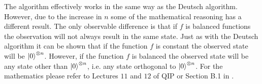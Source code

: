 % 

The algorithm effectively works in the same way as the Deutsch algorithm.
However, due to the increase in $n$ some of the mathematical reasoning has a different result.
The only observable difference is that if $f$ is balanced functions the observation will not always result in the same state.
Just as with the Deutsch algorithm it can be shown that if the function $f$ is constant the observed state will be $\left\vert{0}\right\rangle^{\otimes{n}}$.
However, if the function $f$ is balanced the observed state will be any state other than $\left\vert{0}\right\rangle^{\otimes{n}}$, i.e. any state orthogonal to $\left\vert{0}\right\rangle^{\otimes{n}}$.
For the mathematics please refer to Lectures $11$ and $12$ of QIP\cite{QIPLect} or Section B.1 in \cite{Stepney07searchingfor}.

